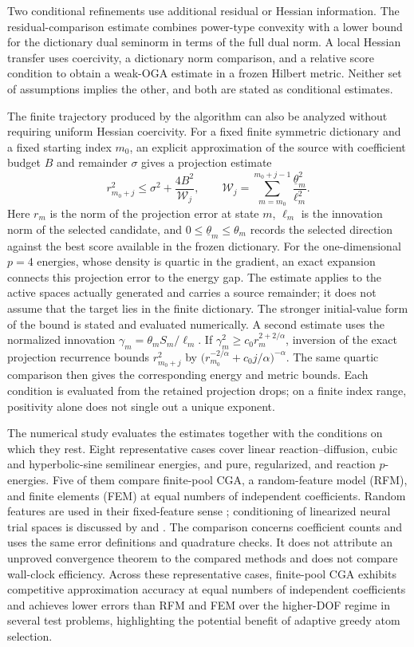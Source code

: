 Two conditional refinements use additional residual or Hessian information. The residual-comparison
estimate combines power-type convexity with a lower bound for the dictionary dual seminorm in terms
of the full dual norm. A local Hessian transfer uses coercivity, a dictionary norm comparison, and a
relative score condition to obtain a weak-OGA estimate in a frozen Hilbert metric. Neither set of
assumptions implies the other, and both are stated as conditional estimates.

The finite trajectory produced by the algorithm can also be analyzed without requiring uniform
Hessian coercivity. For a fixed finite symmetric dictionary and a fixed starting index \(m_0\), an
explicit approximation of the source with coefficient budget \(B\) and remainder \(\sigma\) gives a
projection estimate
\[
 r_{m_0+j}^2\le \sigma^2+\frac{4B^2}{\mathcal W_j},
 \qquad
 \mathcal W_j=\sum_{m=m_0}^{m_0+j-1}\frac{\underline\theta_m^2}{\ell_m^2}.
\]
Here \(r_m\) is the norm of the projection error at state \(m\), \(\ell_m\) is the innovation norm of
the selected candidate, and \(0\leq\underline\theta_m\leq\theta_m\) records the selected direction
against the best score available in the frozen dictionary. For the one-dimensional \(p=4\) energies,
whose density is quartic in the gradient, an exact expansion connects this projection error to the
energy gap. The estimate applies to the active spaces actually generated and carries a source
remainder; it does not assume that the target lies in the finite dictionary. The stronger
initial-value form of the bound is stated and evaluated numerically. A second estimate uses the
normalized innovation \(\gamma_m=\theta_m S_m/\ell_m\). If
\(\gamma_m^2\geq c_0r_m^{2+2/\alpha}\), inversion of the exact projection recurrence bounds
\(r_{m_0+j}^2\) by
\(\big(r_{m_0}^{-2/\alpha}+c_0j/\alpha\big)^{-\alpha}\). The same quartic comparison
then gives the corresponding energy and metric bounds. Each condition is evaluated from the retained
projection drops; on a finite index range, positivity alone does not single out a unique exponent.

The numerical study evaluates the estimates together with the conditions on which they rest. Eight
representative cases cover linear reaction--diffusion, cubic and hyperbolic-sine semilinear
energies, and pure, regularized, and reaction \(p\)-energies. Five of them compare finite-pool CGA, a
random-feature model (RFM), and finite elements (FEM) at equal numbers of independent coefficients.
Random features are used in their fixed-feature sense \citep{RahimiRecht2007}; conditioning of
linearized neural trial spaces is discussed by \cite{ChenChiEYang2022} and
\cite{MaoXuXu2026}. The comparison concerns coefficient counts and uses the same error definitions
and quadrature checks. It does
not attribute an unproved convergence theorem to the compared methods and does not compare
wall-clock efficiency. Across these representative cases, finite-pool CGA exhibits competitive approximation accuracy at equal numbers of independent coefficients and achieves lower errors than RFM and FEM over the higher-DOF regime in several test problems, highlighting the potential benefit of adaptive greedy atom selection.

